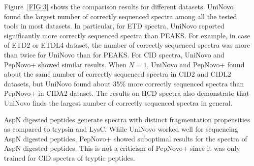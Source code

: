 




Figure~\ref{FIG:3}  shows the comparison results for different datasets.
UniNovo found the largest number of correctly sequenced spectra among all the tested tools in most datasets. In particular, for ETD spectra, UniNovo reported significantly more correctly sequenced spectra than PEAKS. For example, in case of ETD2 or ETDL4 dataset, the number of correctly sequenced spectra was more than twice for UniNovo than for PEAKS. 
%
For CID spectra, UniNovo and PepNovo+ showed similar results.  When $N=1$, UniNovo and  PepNovo+ found about the same number of  correctly sequenced spectra in CID2 and CIDL2  datasets, but UniNovo found about 35\% more  correctly sequenced spectra than PepNovo+ in CIDA2 dataset.  
%
The results on HCD spectra also demonstrate that UniNovo finds the largest number of correctly sequenced spectra in general. %

 AspN digested peptides generate  spectra with distinct fragmentation propensities as compared to trypsin and LysC.  While UniNovo worked well for sequencing AspN digested peptides,  PepNovo+ showed suboptimal results for the spectra of AspN digested peptides. This is not a criticism of PepNovo+ since it was only trained for CID spectra of tryptic peptides. 



